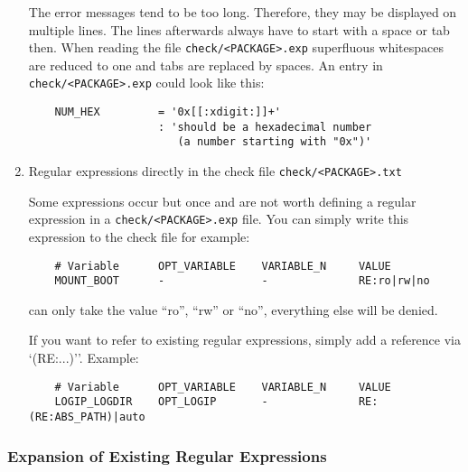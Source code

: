 \begin{enumerate}
The error messages tend to be too long. Therefore, they may be displayed on multiple lines.
The lines afterwards always have to start with a space or tab then. When reading the file
\texttt{check/<PACKAGE>.exp} superfluous whitespaces are reduced to one and tabs are replaced
by spaces. An entry in \texttt{check/<PACKAGE>.exp} could look like this:

\begin{example}
\begin{verbatim}
    NUM_HEX         = '0x[[:xdigit:]]+'
                    : 'should be a hexadecimal number
                       (a number starting with "0x")'
\end{verbatim}
\end{example}

\item  Regular expressions directly in the check file \texttt{check/<PACKAGE>.txt}

Some expressions occur but once and are not worth defining a regular expression in a
\texttt{check/<PACKAGE>.exp} file. You can simply write this expression to the check
file for example:

\begin{example}
\begin{verbatim}
    # Variable      OPT_VARIABLE    VARIABLE_N     VALUE
    MOUNT_BOOT      -               -              RE:ro|rw|no
\end{verbatim}
\end{example}

 can only take the value ``ro'', ``rw'' or ``no'',
everything else will be denied.

If you want to refer to existing regular expressions, simply add
a reference via `(RE:...)''. Example:

\begin{example}
\begin{verbatim}
    # Variable      OPT_VARIABLE    VARIABLE_N     VALUE
    LOGIP_LOGDIR    OPT_LOGIP       -              RE:(RE:ABS_PATH)|auto
\end{verbatim}
\end{example}

\end{enumerate}


\subsubsection{Expansion of Existing Regular Expressions}


